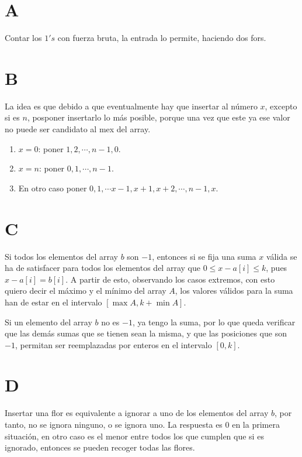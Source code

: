 \documentclass[14pt]{extarticle}
\begin{document}
\tableofcontents

\section{A}

Contar los $1's$  con fuerza bruta, la entrada lo permite, haciendo dos fors.

\section{B}

La idea es que debido a que eventualmente hay que insertar al número $x$, excepto si es $n$, posponer insertarlo lo más posible, porque una vez que este ya ese valor no puede ser candidato al mex del array.

\begin{enumerate}
    \item $x = 0$: poner $1, 2, \cdots , n-1, 0$.  
    \item $x = n$: poner $0, 1, \cdots, n-1$.
    \item En otro caso poner $0, 1, \cdots x-1, x+1, x+2, \cdots, n-1, x$. 
\end{enumerate}

\section{C}

Si todos los elementos del array $b$ son $-1$, entonces si se fija una suma $x$ válida se ha de satisfacer para todos los elementos del array que $0 \leq x - a[i] \leq k$, pues $x - a[i] = b[i]$. A partir de esto, observando los casos extremos, con esto quiero decir el máximo y el mínimo del array $A$, los valores válidos para la suma han de estar en el intervalo $[\max{A}, k + \min{A}]$.

Si un elemento del array $b$ no es $-1$, ya tengo la suma, por lo que queda verificar que las demás sumas que se tienen sean la misma, y que las posiciones que son $-1$, permitan ser reemplazadas por enteros en el intervalo $[0, k]$.

\section{D}

Insertar una flor es equivalente a ignorar a uno de los elementos del array $b$, por tanto, no se ignora ninguno, o se ignora uno. La respuesta es $0$ en la primera situación, en otro caso es el menor entre todos los que cumplen que si es ignorado, entonces se pueden recoger todas las flores.
\end{document}
